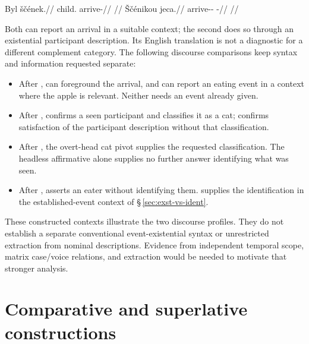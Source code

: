 \pex
\a
\begingl
\gla Byl ščének.//
\glb child.\Dir{} arrive-\Pf{}//
\glft {} //
\endgl
\a
\begingl
\gla Ščénikou jeca.//
\glb arrive-\Pf{}-\Nmlz{} \Exst{}-\Cont{}//
\glft {} //
\endgl
\xe

Both can report an arrival in a suitable context; the second does so through
an existential participant description. Its English translation is not a
diagnostic for a different complement category. The following discourse
comparisons keep syntax and information requested separate:

\begin{itemize}[wide]
\item After ,  can foreground the
  arrival, and  can report an eating event in a
  context where the apple is relevant. Neither needs an event already given.
\item After , 
  confirms a seen participant and classifies it as a cat;  confirms satisfaction of the participant description without that
  classification.
\item After , the overt-head cat pivot supplies
  the requested classification. The headless affirmative alone supplies no
  further answer identifying what was seen.
\item After , 
  asserts an eater without identifying them. 
  supplies the identification in the established-event context of
  §\,\ref{sec:exst-vs-ident}.
\end{itemize}

These constructed contexts illustrate the two discourse profiles. They do not
establish a separate conventional event-existential syntax or unrestricted
extraction from nominal descriptions. Evidence from independent temporal
scope, matrix case/voice relations, and extraction would be needed to
motivate that stronger analysis.



\section{Comparative and superlative constructions}\label{sec:comparison}

